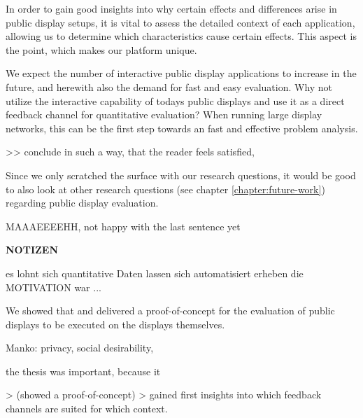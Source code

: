 	In order to gain good insights into why certain effects and differences arise in public display setups, it is vital to assess the detailed context of each application, allowing us to determine which characteristics cause certain effects. This aspect is the point, which makes our platform unique. 

	We expect the number of interactive public display applications to increase in the future, and herewith also the demand for fast and easy evaluation. 
	Why not utilize the interactive capability of todays public displays and use it as a direct feedback channel for quantitative evaluation? When running large display networks, this can be the first step towards an fast and effective problem analysis.



	>> conclude in such a way, that the reader feels satisfied, 

	Since we only scratched the surface with our research questions, it would be good to also look at other research questions (see chapter \ref{chapter:future-work}) regarding public display evaluation.

	MAAAEEEEHH, not happy with the last sentence yet
















	\vfill

	\textbf{NOTIZEN}

	es lohnt sich 
	quantitative Daten lassen sich automatisiert erheben
	die MOTIVATION war ...

	We showed that 
	and delivered a proof-of-concept for the evaluation of public displays to be executed on the displays themselves.

	Manko: privacy, social desirability, 



	the thesis was important, because it 

	> (showed a proof-of-concept)
	> gained first insights into which feedback channels are suited for which context.


